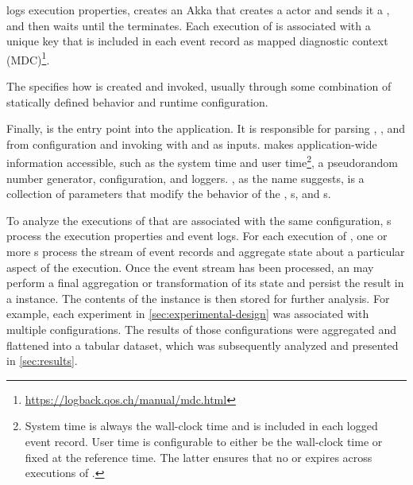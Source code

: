  logs execution properties, creates an Akka  that creates a  actor and sends it a , and then waits until the  terminates. Each execution of  is associated with a unique key that is included in each event record as mapped diagnostic context (MDC)\footnote{\url{https://logback.qos.ch/manual/mdc.html}}.

The  specifies how  is created and invoked, usually through some combination of statically defined behavior and runtime configuration.

Finally,  is the entry point into the application. It is responsible for parsing , , and  from configuration and invoking  with  and  as inputs.  makes application-wide information accessible, such as the system time and user time\footnote{System time is always the wall-clock time and is included in each logged event record. User time is configurable to either be the wall-clock time or fixed at the reference time. The latter ensures that no  or  expires across executions of .}, a pseudorandom number generator,  configuration, and loggers. , as the name suggests, is a collection of parameters that modify the behavior of the , s, and s.

To analyze the executions of  that are associated with the same  configuration, s process the execution properties and event logs. For each execution of , one or more s process the stream of event records and aggregate state about a particular aspect of the execution. Once the event stream has been processed, an  may perform a final aggregation or transformation of its state and persist the result in a  instance. The contents of the  instance is then stored for further analysis. For example, each experiment in \cref{sec:experimental-design} was associated with multiple configurations. The results of those configurations were aggregated and flattened into a tabular dataset, which was subsequently analyzed and presented in \cref{sec:results}.


